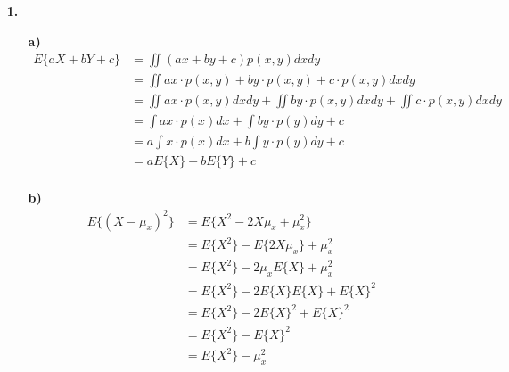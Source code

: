 \documentclass[a4paper,11pt]{article}
\author{\authorinfotitle}
\title{\titleinfo}
\date{\today}
\begin{document}
	\maketitle
	\begin{enumerate}
		\item[\textbf{1.}]
		
		\begin{enumerate}
		\item[\textbf{a)}]
		\begin{align*}
		E\lbrace aX+bY+c\rbrace &= \iint (ax+by+c)p(x,y)dxdy\\
				   &= \iint ax \cdot p(x,y) + by \cdot p(x,y) + c \cdot p(x,y) dxdy\\
				   &= \iint ax \cdot p(x,y) dxdy + \iint by \cdot p(x,y) dxdy + \iint c \cdot p(x,y) dxdy\\
				  &= \int ax \cdot p(x) dx + \int by \cdot p(y) dy +  c\\ 
				  &= a\int x \cdot p(x) dx + b\int y \cdot p(y) dy +  c\\ 
				  &= aE\lbrace X\rbrace + bE\lbrace Y\rbrace +  c\\ 
		\end{align*}
		\item[\textbf{b)}]
		\begin{align*}
		E\lbrace (X-\mu_x)^2\rbrace &= E\lbrace X^2-2X\mu_x + \mu^2_x\rbrace \\
							  		&= E\lbrace X^2\rbrace-E\lbrace 2X\mu_x \rbrace + \mu^2_x\\
							  		&= E\lbrace X^2\rbrace-2\mu_x E\lbrace X \rbrace + \mu^2_x\\				
							  		&= E\lbrace X^2\rbrace-2 E\lbrace X \rbrace E\lbrace X \rbrace + E\lbrace X \rbrace^2\\			
							  		&= E\lbrace X^2\rbrace-2 E\lbrace X \rbrace^2 + E\lbrace X \rbrace^2\\				
							  		&= E\lbrace X^2\rbrace- E\lbrace X \rbrace^2 \\					  						&= E\lbrace X^2\rbrace- \mu_x^2 \\	
		\end{align*}
		\end{enumerate}
	\end{enumerate}
\end{document}
